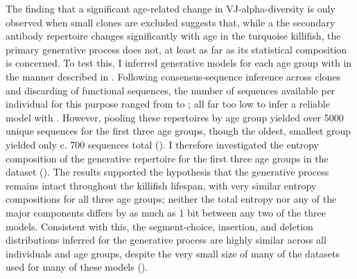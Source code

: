 The finding that a significant age-related change in VJ-alpha-diversity is only observed when small clones are excluded suggests that, while a the secondary antibody repertoire changes significantly with age in the turquoise killifish, the primary generative process does not, at least as far as its statistical composition is concerned. To test this, I inferred generative models for each age group with  in the manner described in . Following consensus-sequence inference across clones and discarding of functional sequences, the number of sequences available per individual for this purpose ranged from  to ; all far too low to infer a reliable model with . However, pooling these repertoires by age group yielded over 5000 unique sequences for the first three age groups, though the oldest, smallest group yielded only c. 700 sequences total (). I therefore investigated the entropy composition of the generative repertoire for the first three age groups in the dataset (). The results supported the hypothesis that the generative process remains intact throughout the killifish lifespan, with very similar entropy compositions for all three age groups; neither the total entropy nor any of the major components differs by as much as 1 bit between any two of the three models. Consistent with this, the segment-choice, insertion, and deletion distributions inferred for the generative process are highly similar across all individuals and age groups, despite the very small size of many of the datasets used for many of these models ().

